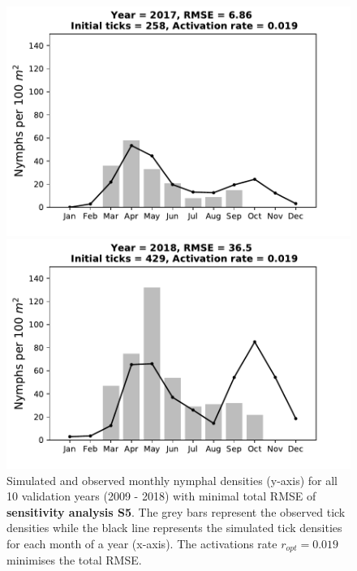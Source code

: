 \documentclass[a4paper, 11pt]{scrartcl}
\begin{document}
\begin{figure}[h!]
\begin{minipage}[c]{0.40\linewidth}
\end{minipage}
\begin{minipage}[c]{0.40\linewidth}
\includegraphics[width=\linewidth]{figures/s5/s5_2017}
\end{minipage}
\begin{minipage}[c]{0.40\linewidth}
\includegraphics[width=\linewidth]{figures/s5/s5_2018}
\end{minipage}
\caption{Simulated and observed monthly nymphal densities (y-axis) for all 10 validation years (2009 - 2018) with minimal total RMSE of \textbf{sensitivity analysis S5}. The
grey bars represent the observed tick densities while the black line represents the simulated tick densities for each month of a year (x-axis). The activations rate
$r_{opt}= 0.019$ minimises the total RMSE.}
\label{fig:1nymphs_4larvae}
\end{figure}
\end{document}
